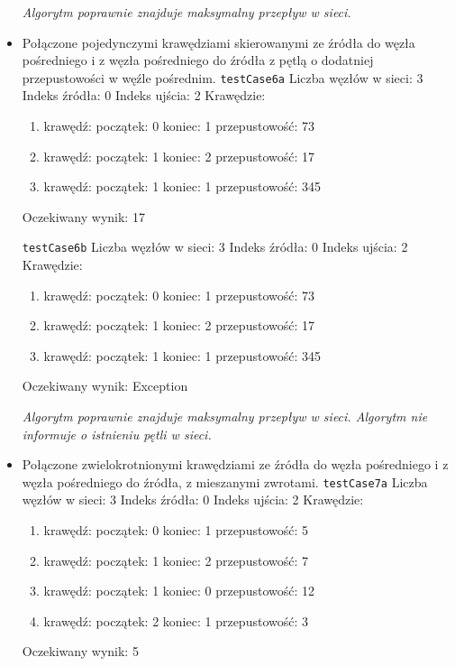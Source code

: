 \begin{itemize}[nosep]
    \emph{Algorytm poprawnie znajduje maksymalny
    przepływ w sieci.}

    \item Połączone pojedynczymi krawędziami skierowanymi ze źródła do węzła
    pośredniego i z węzła pośredniego do źródła z pętlą o dodatniej
    przepustowości w węźle pośrednim.
    \texttt{testCase6a}
    Liczba węzłów w sieci: 3
    Indeks źródła: 0
    Indeks ujścia: 2
    Krawędzie:
    \begin{enumerate}[nosep]
        \item krawędź:
        początek: 0
        koniec: 1
        przepustowość: 73
        \item krawędź:
        początek: 1
        koniec: 2
        przepustowość: 17
        \item krawędź:
        początek: 1
        koniec: 1
        przepustowość: 345
    \end{enumerate}
    Oczekiwany wynik: 17

    \texttt{testCase6b}
    Liczba węzłów w sieci: 3
    Indeks źródła: 0
    Indeks ujścia: 2
    Krawędzie:
    \begin{enumerate}[nosep]
        \item krawędź:
        początek: 0
        koniec: 1
        przepustowość: 73
        \item krawędź:
        początek: 1
        koniec: 2
        przepustowość: 17
        \item krawędź:
        początek: 1
        koniec: 1
        przepustowość: 345
    \end{enumerate}
    Oczekiwany wynik: Exception

    \emph{Algorytm poprawnie znajduje maksymalny
    przepływ w sieci. Algorytm nie informuje o istnieniu pętli w sieci.}

    \item Połączone zwielokrotnionymi krawędziami ze źródła do węzła pośredniego
    i z węzła pośredniego do źródła, z mieszanymi zwrotami.
    \texttt{testCase7a}
    Liczba węzłów w sieci: 3
    Indeks źródła: 0
    Indeks ujścia: 2
    Krawędzie:
    \begin{enumerate}[nosep]
        \item krawędź:
        początek: 0
        koniec: 1
        przepustowość: 5
        \item krawędź:
        początek: 1
        koniec: 2
        przepustowość: 7
        \item krawędź:
        początek: 1
        koniec: 0
        przepustowość: 12
        \item krawędź:
        początek: 2
        koniec: 1
        przepustowość: 3
    \end{enumerate}
    Oczekiwany wynik: 5


\end{itemize}
